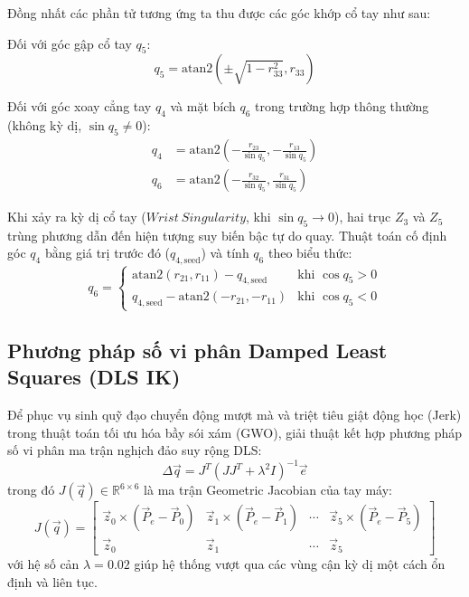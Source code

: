 Đồng nhất các phần tử tương ứng ta thu được các góc khớp cổ tay như sau:

Đối với góc gập cổ tay $q_5$:
\begin{equation}
    q_5 = \text{atan2}(\pm\sqrt{1 - r_{33}^2}, r_{33})
\end{equation}

Đối với góc xoay cẳng tay $q_4$ và mặt bích $q_6$ trong trường hợp thông thường (không kỳ dị, $\sin q_5 \ne 0$):
\begin{align}
    q_4 &= \text{atan2}\left(-\frac{r_{23}}{\sin q_5}, -\frac{r_{13}}{\sin q_5}\right) \\
    q_6 &= \text{atan2}\left(-\frac{r_{32}}{\sin q_5}, \frac{r_{31}}{\sin q_5}\right)
\end{align}

Khi xảy ra kỳ dị cổ tay ($Wrist\ Singularity$, khi $\sin q_5 \to 0$), hai trục $Z_3$ và $Z_5$ trùng phương dẫn đến hiện tượng suy biến bậc tự do quay. Thuật toán cố định góc $q_4$ bằng giá trị trước đó ($q_{4,\text{seed}}$) và tính $q_6$ theo biểu thức:
\begin{equation}
    q_6 = \begin{cases}
        \text{atan2}(r_{21}, r_{11}) - q_{4,\text{seed}} & \text{khi } \cos q_5 > 0 \\
        q_{4,\text{seed}} - \text{atan2}(-r_{21}, -r_{11}) & \text{khi } \cos q_5 < 0
    \end{cases}
\end{equation}

\subsection{Phương pháp số vi phân Damped Least Squares (DLS IK)}
\label{sec:dls_ik}

Để phục vụ sinh quỹ đạo chuyển động mượt mà và triệt tiêu giật động học (Jerk) trong thuật toán tối ưu hóa bầy sói xám (GWO), giải thuật kết hợp phương pháp số vi phân ma trận nghịch đảo suy rộng DLS:
\begin{equation}
    \Delta \vec{q} = J^T \left( J J^T + \lambda^2 I \right)^{-1} \vec{e}
\end{equation}
trong đó $J(\vec{q}) \in \mathbb{R}^{6 \times 6}$ là ma trận Geometric Jacobian của tay máy:
\begin{equation}
    J(\vec{q}) = \begin{bmatrix}
        \vec{z}_0 \times (\vec{P}_e - \vec{P}_0) & \vec{z}_1 \times (\vec{P}_e - \vec{P}_1) & \cdots & \vec{z}_5 \times (\vec{P}_e - \vec{P}_5) \\
        \vec{z}_0 & \vec{z}_1 & \cdots & \vec{z}_5
    \end{bmatrix}
\end{equation}
với hệ số cản $\lambda = 0.02$ giúp hệ thống vượt qua các vùng cận kỳ dị một cách ổn định và liên tục.
